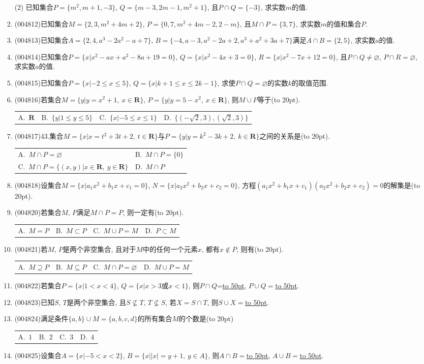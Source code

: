 \documentclass[10pt,a4paper]{article}
\newcommand{\blank}[1]{\underline{\hbox to #1pt{}}}
\newcommand{\bracket}[1]{(\hbox to #1pt{})}
\newcommand{\twoch}[4]{\par\begin{tabular}{p{.46\textwidth}p{.46\textwidth}}
A.~#1& B.~#2\\
C.~#3& D.~#4
\end{tabular}}
\newcommand{\fourch}[4]{\par\begin{tabular}{p{.23\textwidth}p{.23\textwidth}p{.23\textwidth}p{.23\textwidth}}
A.~#1 &B.~#2& C.~#3& D.~#4
\end{tabular}}
\begin{document}
\begin{enumerate}[1.]
(2) 已知集合$P=\{m^2,m+1,-3\}$, $Q=\{m-3,2m-1,m^2+1\}$, 且$P\cap Q=\{-3\}$, 求实数$m$的值.
\item {\tiny (004812)}已知集合$M=\{2,3,m^2+4m+2\}$, $P=\{0,7,m^2+4m-2,2-m\}$, 且$M\cap P=\{3,7\}$, 求实数$m$的值和集合$P$.
\item {\tiny (004813)}已知集合$A=\{2,4,a^3-2a^2-a+7\}$, $B=\{-4,a-3,a^2-2a+2,a^3+a^2+3a+7\}$满足$A\cap B=\{2,5\}$, 求实数$a$的值.
\item {\tiny (004814)}已知集合$P=\{x|x^2-ax+a^2-8a+19=0\}$, $Q=\{x|x^2-4x+3=0\}$, $R=\{x|x^2-7x+12=0\}$, 且$P\cap Q\ne \varnothing$, $P\cap R=\varnothing$, 求实数$a$的值.
\item {\tiny (004815)}已知集合$P=\{x|-2\le x\le 5\}$, $Q=\{x|k+1\le x\le 2k-1\}$, 求使$P\cap Q=\varnothing$的实数$k$的取值范围.
\item {\tiny (004816)}若集合$M=\{y|y=x^2+1, \ x\in \mathbf{R}\}$, $P=\{y|y=5-x^2, \ x\in \mathbf{R}\}$, 则$M\cup P$等于\bracket{20}.
\fourch{$\mathbf{R}$}{$\{y|1\le y\le 5\}$}{$\{x|-5\le x\le 1\}$}{$\{(-\sqrt 2,3),(\sqrt 2,3)\}$}
\item {\tiny (004817)}43.集合$M=\{x |x=t^2+3t+2,\ t\in \mathbf{R}\}$与$P=\{y |y=k^2-3k+2,\ k\in \mathbf{R}\}$之间的关系是\bracket{20}.
\twoch{$M\cap P=\varnothing$}{$M\cap P=\{ 0\}$}{$M\cap P=\{(x,y)|x \in \mathbf{R}, \ y  \in \mathbf{R}\}$}{$M\cap P$}
\item {\tiny (004818)}设集合$M=\{x|a_1x^2+b_1x+c_1=0\}$, $N=\{x|a_2x^2+b_2x+c_2=0\}$, 方程$(a_1x^2+b_1x+c_1)(a_2x^2+b_2x+c_2)=0$的解集是\bracket{20}.
\item {\tiny (004820)}若集合$M$, $P$满足$M\cap P=P$, 则一定有\bracket{20}.
\fourch{$M=P$}{$M\subset P$}{$M\cup P=M$}{$P\subset M$}
\item {\tiny (004821)}若$M$, $P$是两个非空集合, 且对于$M$中的任何一个元素$x$, 都有$x\notin P$, 则有\bracket{20}.
\fourch{$M\supseteq P$}{$M\subseteq P$}{$M\cap P=\varnothing$}{$M\cup P=M$}
\item {\tiny (004822)}若集合$P=\{x|1<x<4\}$, $Q=\{x|x>3\text{或}x<1\}$, 则$P\cap Q$=\blank{50}, $P\cup Q=$\blank{50}.
\item {\tiny (004823)}已知$S$, $T$是两个非空集合, 且$S\not\subseteq T$, $T\not\subseteq S$, 若$X=S\cap T$, 则$S\cup X=$\blank{50}.
\item {\tiny (004824)}满足条件$\{a,b\}\cup M=\{a,b,c,d\}$的所有集合$M$的个数是\bracket{20}
\fourch{$1$}{$2$}{$3$}{$4$}
\item {\tiny (004825)}设集合$A=\{x|-5<x<2\}$, $B=\{x||x|=y+1, \ y\in A\}$, 则$A\cap B=$\blank{50}, $A\cup B=$\blank{50}.

\end{enumerate}
\end{document}
